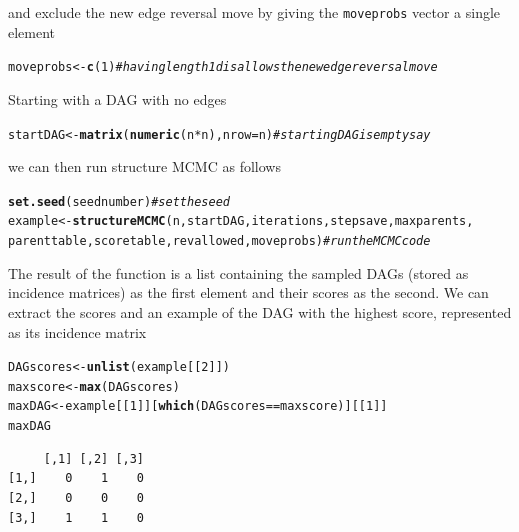 \documentclass[a4paper]{article}\usepackage[]{graphicx}\usepackage[]{color}
\makeatletter
\newcommand{\hlnum}[1]{\textcolor[rgb]{0.686,0.059,0.569}{#1}}%
\newcommand{\hlcom}[1]{\textcolor[rgb]{0.678,0.584,0.686}{\textit{#1}}}%
\newcommand{\hlopt}[1]{\textcolor[rgb]{0,0,0}{#1}}%
\newcommand{\hlstd}[1]{\textcolor[rgb]{0.345,0.345,0.345}{#1}}%
\newcommand{\hlkwb}[1]{\textcolor[rgb]{0.69,0.353,0.396}{#1}}%
\newcommand{\hlkwc}[1]{\textcolor[rgb]{0.333,0.667,0.333}{#1}}%
\newcommand{\hlkwd}[1]{\textcolor[rgb]{0.737,0.353,0.396}{\textbf{#1}}}%
\newenvironment{kframe}{%
 \def\at@end@of@kframe{}%
 \ifinner\ifhmode%
  \def\at@end@of@kframe{\end{minipage}}%
  \begin{minipage}{\columnwidth}%
 \fi\fi%
 \def\FrameCommand##1{\hskip\@totalleftmargin \hskip-\fboxsep
 \colorbox{shadecolor}{##1}\hskip-\fboxsep
     \hskip-\linewidth \hskip-\@totalleftmargin \hskip\columnwidth}%
 \MakeFramed {\advance\hsize-\width
   \@totalleftmargin\z@ \linewidth\hsize
   \@setminipage}}%
 {\par\unskip\endMakeFramed%
 \at@end@of@kframe}
\newenvironment{knitrout}{}{} %
\newcommand{\nn}{\noindent}
\makeatother
\begin{document}
\nn and exclude the new edge reversal move by giving the \texttt{moveprobs} vector a single element

\begin{knitrout}
\color{fgcolor}\begin{kframe}
\begin{alltt}
\hlstd{moveprobs} \hlkwb{<-} \hlkwd{c}\hlstd{(}\hlnum{1}\hlstd{)}  \hlcom{# having length 1 disallows the new edge reversal move}
\end{alltt}
\end{kframe}
\end{knitrout}

\nn Starting with a DAG with no edges

\begin{knitrout}
\color{fgcolor}\begin{kframe}
\begin{alltt}
\hlstd{startDAG} \hlkwb{<-} \hlkwd{matrix}\hlstd{(}\hlkwd{numeric}\hlstd{(n} \hlopt{*} \hlstd{n),} \hlkwc{nrow} \hlstd{= n)}  \hlcom{# starting DAG is empty say}
\end{alltt}
\end{kframe}
\end{knitrout}

\nn we can then run structure MCMC as follows

\begin{knitrout}
\color{fgcolor}\begin{kframe}
\begin{alltt}
\hlkwd{set.seed}\hlstd{(seednumber)}  \hlcom{# set the seed}
\hlstd{example} \hlkwb{<-} \hlkwd{structureMCMC}\hlstd{(n, startDAG, iterations, stepsave, maxparents,}
    \hlstd{parenttable, scoretable, revallowed, moveprobs)}  \hlcom{# run the MCMC code}
\end{alltt}
\end{kframe}
\end{knitrout}

\nn The result of the function is a list containing the sampled DAGs (stored as incidence matrices) as the first element and their scores as the second.  We can extract the scores and an example of the DAG with the highest score, represented as its incidence matrix

\begin{knitrout}
\color{fgcolor}\begin{kframe}
\begin{alltt}
\hlstd{DAGscores} \hlkwb{<-} \hlkwd{unlist}\hlstd{(example[[}\hlnum{2}\hlstd{]])}
\hlstd{maxscore} \hlkwb{<-} \hlkwd{max}\hlstd{(DAGscores)}
\hlstd{maxDAG} \hlkwb{<-} \hlstd{example[[}\hlnum{1}\hlstd{]][}\hlkwd{which}\hlstd{(DAGscores} \hlopt{==} \hlstd{maxscore)][[}\hlnum{1}\hlstd{]]}
\hlstd{maxDAG}
\end{alltt}
\begin{verbatim}
     [,1] [,2] [,3]
[1,]    0    1    0
[2,]    0    0    0
[3,]    1    1    0
\end{verbatim}
\end{kframe}
\end{knitrout}
\end{document}
